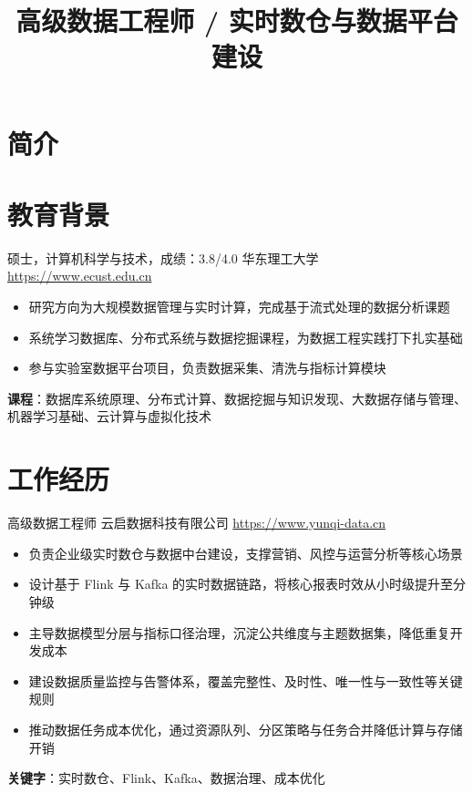 \documentclass[a4paper, serif, 10pt]{moderncv}
\title{高级数据工程师 / 实时数仓与数据平台建设}
\begin{document}
\maketitle

\section{简介}

\section{教育背景}

        {硕士，计算机科学与技术，成绩：3.8/4.0}
        {华东理工大学}
        {\url{https://www.ecust.edu.cn}}
        {}
        {\begin{itemize}
\item 研究方向为大规模数据管理与实时计算，完成基于流式处理的数据分析课题
\item 系统学习数据库、分布式系统与数据挖掘课程，为数据工程实践打下扎实基础
\item 参与实验室数据平台项目，负责数据采集、清洗与指标计算模块
\end{itemize}
\textbf{课程}：数据库系统原理、分布式计算、数据挖掘与知识发现、大数据存储与管理、机器学习基础、云计算与虚拟化技术}
\section{工作经历}

        {高级数据工程师}
        {云启数据科技有限公司}
        {\url{https://www.yunqi-data.cn}}
        {}
        {\begin{itemize}
\item 负责企业级实时数仓与数据中台建设，支撑营销、风控与运营分析等核心场景
\item 设计基于 Flink 与 Kafka 的实时数据链路，将核心报表时效从小时级提升至分钟级
\item 主导数据模型分层与指标口径治理，沉淀公共维度与主题数据集，降低重复开发成本
\item 建设数据质量监控与告警体系，覆盖完整性、及时性、唯一性与一致性等关键规则
\item 推动数据任务成本优化，通过资源队列、分区策略与任务合并降低计算与存储开销
\end{itemize}
\textbf{关键字}：实时数仓、Flink、Kafka、数据治理、成本优化}
\end{document}

